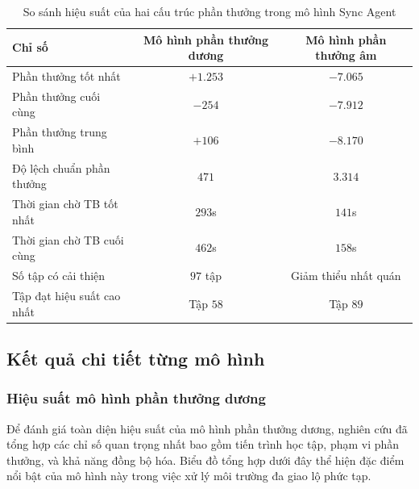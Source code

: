 \begin{table}[!htp]
    \centering
    \caption{So sánh hiệu suất của hai cấu trúc phần thưởng trong mô hình Sync Agent}
    \label{tab:sync_performance_comparison}
    \begin{tabular}{@{}lcc@{}}
        \toprule
        \textbf{Chỉ số} & \textbf{Mô hình phần thưởng dương} & \textbf{Mô hình phần thưởng âm} \\
        \midrule
        Phần thưởng tốt nhất      & $+1.253$                      & $-7.065$                      \\
        Phần thưởng cuối cùng     & $-254$                        & $-7.912$                      \\
        Phần thưởng trung bình    & $+106$                        & $-8.170$                      \\
        Độ lệch chuẩn phần thưởng & $471$                         & $3.314$                       \\
        Thời gian chờ TB tốt nhất & $293$s                        & $141$s                        \\
        Thời gian chờ TB cuối cùng & $462$s                        & $158$s                        \\
        Số tập có cải thiện       & $97$ tập                         & Giảm thiểu nhất quán            \\
        Tập đạt hiệu suất cao nhất & Tập $58$                         & Tập $89$                         \\
        \bottomrule
    \end{tabular}
\end{table}

\subsection{Kết quả chi tiết từng mô hình}

\subsubsection{Hiệu suất mô hình phần thưởng dương}
Để đánh giá toàn diện hiệu suất của mô hình phần thưởng dương, nghiên cứu đã tổng hợp các chỉ số quan trọng nhất bao gồm tiến trình học tập, phạm vi phần thưởng, và khả năng đồng bộ hóa. Biểu đồ tổng hợp dưới đây thể hiện đặc điểm nổi bật của mô hình này trong việc xử lý môi trường đa giao lộ phức tạp.

